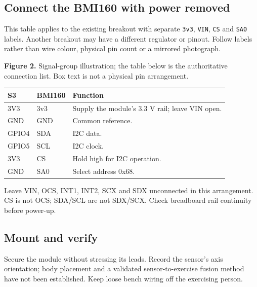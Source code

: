 \documentclass[11pt,a4paper]{article}
\newcommand{\file}[1]{\nolinkurl{#1}}
\begin{document}
\subsection{Connect the BMI160 with power removed}
This table applies to the existing breakout with separate \file{3v3}, \file{VIN}, \file{CS} and \file{SA0} labels. Another breakout may have a different regulator or pinout. Follow labels rather than wire colour, physical pin count or a mirrored photograph.
\begin{center}
\end{center}
\textbf{Figure 2.} Signal-group illustration; the table below is the authoritative connection list. Box text is not a physical pin arrangement.
\par\begin{tabularx}{\linewidth}{@{}l l X@{}}\toprule
S3 & BMI160 & Function\\\midrule
3V3 & 3v3 & Supply the module's 3.3 V rail; leave VIN open.\\
GND & GND & Common reference.\\
GPIO4 & SDA & I2C data.\\
GPIO5 & SCL & I2C clock.\\
3V3 & CS & Hold high for I2C operation.\\
GND & SA0 & Select address 0x68.\\\bottomrule
\end{tabularx}
Leave VIN, OCS, INT1, INT2, SCX and SDX unconnected in this arrangement. CS is not OCS; SDA/SCL are not SDX/SCX. Check breadboard rail continuity before power-up.
\subsection{Mount and verify}
Secure the module without stressing its leads. Record the sensor's axis orientation; body placement and a validated sensor-to-exercise fusion method have not been established. Keep loose bench wiring off the exercising person.
\end{document}
